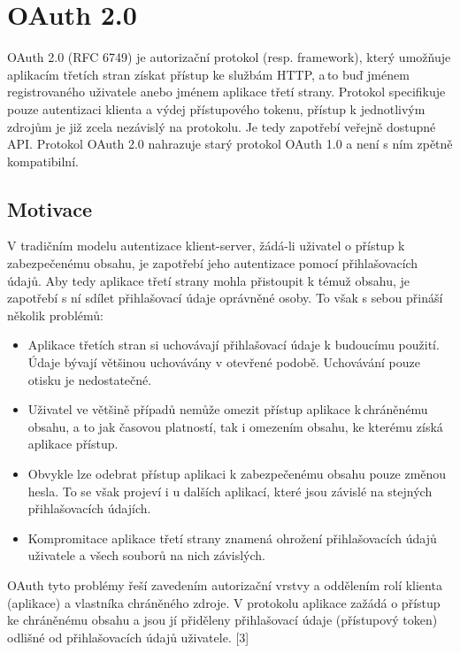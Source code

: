\documentclass[]{fithesis3}
\begin{document}
\chapter{OAuth 2.0}

OAuth 2.0 (RFC 6749) je autorizační protokol (resp. framework), který umožňuje aplikacím třetích stran získat přístup ke službám HTTP, a\,to buď jménem registrovaného uživatele anebo jménem aplikace třetí strany. Protokol specifikuje pouze autentizaci klienta a výdej přístupového tokenu, přístup k jednotlivým zdrojům je již zcela nezávislý na protokolu. Je tedy zapotřebí veřejně dostupné API. Protokol OAuth 2.0 nahrazuje starý protokol OAuth 1.0 a není s ním zpětně kompatibilní.

	\section{Motivace}

	V tradičním modelu autentizace klient-server, žádá-li uživatel o přístup k zabezpečenému 			obsahu, je zapotřebí jeho autentizace pomocí přihlašovacích údajů. Aby tedy aplikace třetí 			strany mohla přistoupit k témuž obsahu, je zapotřebí s ní sdílet přihlašovací údaje oprávněné 		osoby. To však s sebou přináší několik problémů:

		\begin{itemize}
  		\item 
		Aplikace třetích stran si uchovávají přihlašovací údaje k budoucímu použití. Údaje bývají 			většinou uchovávány v otevřené podobě. Uchovávání pouze otisku je nedostatečné.

 		 \item 
		Uživatel ve většině případů nemůže omezit přístup aplikace k\,chráněnému obsahu, a to 			jak časovou platností, tak i omezením obsahu, ke kterému získá aplikace přístup.

 		 \item 
		Obvykle lze odebrat přístup aplikaci k zabezpečenému obsahu pouze 							změnou hesla. To se však projeví i u dalších aplikací, které jsou závislé na stejných 				přihlašovacích údajích.

  		\item 
		Kompromitace aplikace třetí strany znamená ohrožení přihlašovacích údajů 						uživatele a všech souborů na nich závislých.
		\end{itemize}

	OAuth tyto problémy řeší zavedením autorizační vrstvy a oddělením rolí klienta 					(aplikace) a vlastníka chráněného zdroje. V protokolu aplikace zažádá o přístup ke 				chráněnému obsahu  a jsou jí přiděleny přihlašovací údaje (přístupový token) odlišné od 			přihlašovacích údajů uživatele. [3]
\end{document}
